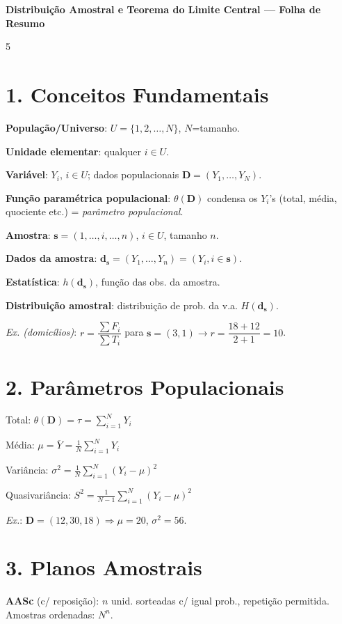 \documentclass[7pt,landscape,a4paper]{extarticle}
\begin{document}
\begin{center}
{\normalsize\bfseries Distribuição Amostral e Teorema do Limite Central --- Folha de Resumo}
\end{center}
\vspace{-4pt}

\setlength{\columnsep}{7pt}
\setlength{\columnseprule}{0.2pt}
\begin{multicols*}{5}

\section{1. Conceitos Fundamentais}
\textbf{População/Universo}: $U=\{1,2,\dots,N\}$, $N$=tamanho.

\textbf{Unidade elementar}: qualquer $i \in U$.

\textbf{Variável}: $Y_i$, $i\in U$; dados populacionais $\mathbf{D}=(Y_1,\dots,Y_N)$.

\textbf{Função paramétrica populacional}: $\theta(\mathbf{D})$ condensa os $Y_i$'s (total, média, quociente etc.) = \emph{parâmetro populacional}.

\textbf{Amostra}: $\mathbf{s}=(1,\dots,i,\dots,n)$, $i\in U$, tamanho $n$.

\textbf{Dados da amostra}: $\mathbf{d_s}=(Y_1,\dots,Y_n)=(Y_i,i\in\mathbf{s})$.

\textbf{Estatística}: $h(\mathbf{d_s})$, função das obs. da amostra.

\textbf{Distribuição amostral}: distribuição de prob. da v.a. $H(\mathbf{d_s})$.

\textit{Ex. (domicílios)}: $r=\dfrac{\sum F_i}{\sum T_i}$ para $\mathbf{s}=(3,1)\to r=\dfrac{18+12}{2+1}=10$.

\section{2. Parâmetros Populacionais}
Total: $\theta(\mathbf{D})=\tau=\sum_{i=1}^N Y_i$

Média: $\mu=\overline{Y}=\frac{1}{N}\sum_{i=1}^N Y_i$

Variância: $\sigma^2=\frac{1}{N}\sum_{i=1}^N (Y_i-\mu)^2$

Quasivariância: $S^2=\frac{1}{N-1}\sum_{i=1}^N (Y_i-\mu)^2$

\textit{Ex.}: $\mathbf D=(12,30,18)\Rightarrow \mu=20$, $\sigma^2=56$.

\section{3. Planos Amostrais}
\textbf{AASc} (c/ reposição): $n$ unid. sorteadas c/ igual prob., repetição permitida. Amostras ordenadas: $N^n$.


\end{multicols*}
\end{document}
